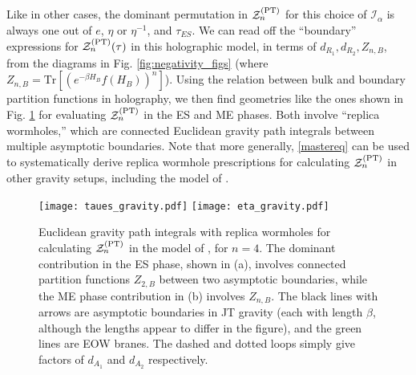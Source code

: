 \documentclass[a4paper,11pt]{article}
\newcommand\al{{\alpha}}
\newcommand\sI{{\ensuremath{{\mathcal I}}}}
\newcommand\sZ{{\mathcal Z}}
\begin{document}
\begin{enumerate}
\begin{appendix}
Like in other cases, the dominant permutation in $\sZ_n^{\rm (PT)}$ for this choice of $\sI_{\al}$ is always one out of $e$, $\eta$ or $\eta^{-1}$, and $\tau_{ES}$. We can read off the ``boundary'' expressions for $\sZ_n^{\rm (PT)}(\tau)$ in this holographic model, in terms of $d_{R_1}, d_{R_2}, Z_{n, B}$, from the diagrams in Fig. \ref{fig:negativity_figs} (where $Z_{n, B}= \text{Tr}[(e^{-\beta H_B} f(H_B))^n]$). Using the relation between bulk and boundary partition functions in holography, we then find geometries like the ones shown in Fig. \ref{fig:gravity_figs} for evaluating $\sZ_n^{\rm (PT)}$ in the ES and ME phases. Both involve ``replica wormholes,'' which are connected Euclidean gravity path integrals between multiple asymptotic boundaries. Note that more generally, \eqref{mastereq} can be used to systematically derive replica wormhole prescriptions for calculating $\sZ_n^{\rm (PT)}$ in other gravity setups, including the model of \cite{2020JHEP...05..013A}. 
\begin{figure}[!h]
 \centering
 \texttt{[image: taues\_gravity.pdf]}
 \texttt{[image: eta\_gravity.pdf]}
 \caption{Euclidean gravity path integrals with replica wormholes for calculating $\sZ_n^{\rm (PT)}$ in the model of \cite{2019arXiv191111977P}, for $n=4$. The dominant contribution in the ES phase, shown in (a), involves connected partition functions $Z_{2, B}$ between two asymptotic boundaries, while the ME phase contribution in (b) involves $Z_{n, B}$. The black lines with arrows are asymptotic boundaries in JT gravity (each with length $\beta$, although the lengths appear to differ in the figure), and the green lines are EOW branes. The dashed and dotted loops simply give factors of $d_{A_1}$ and $d_{A_2}$ respectively.}
 \label{fig:gravity_figs}
\end{figure}


\end{appendix}
\end{enumerate}
\end{document}
